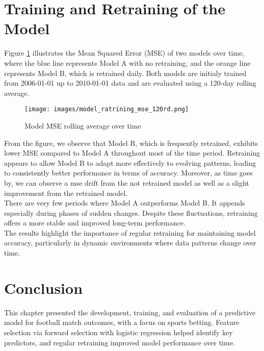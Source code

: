 \section{Training and Retraining of the Model}
\label{sec:training_retraining}

Figure \ref{fig:mse_retraining} illustrates the Mean Squared Error (MSE) of two models over time, where the blue line represents Model A with no retraining, and the orange line represents Model B, which is retrained daily. Both models are initialy trained from 2006-01-01 up to 2010-01-01 data and are evaluated using a 120-day rolling average.

\begin{figure}[H]
    \centering
    \texttt{[image: images/model\_ratrining\_mse\_120rd.png]}
    \caption{Model MSE rolling average over time}
    \label{fig:mse_retraining}
\end{figure}


From the figure, we observe that Model B, which is frequently retrained, exhibits lower MSE compared to Model A throughout most of the time period. Retraining appears to allow Model B to adapt more effectively to evolving patterns, leading to consistently better performance in terms of accuracy. Moreover, as time goes by, we can observe a mse drift from the not retrained model as well as a slight improvement from the retrained model. \\

There are very few periods where Model A outperforms Model B. It appends especially during phases of sudden changes. Despite these fluctuations, retraining offers a more stable and improved long-term performance. \\

The results highlight the importance of regular retraining for maintaining model accuracy, particularly in dynamic environments where data patterns change over time.

\section{Conclusion}

This chapter presented the development, training, and evaluation of a predictive model for football match outcomes, with a focus on sports betting. Feature selection via forward selection with logistic regression helped identify key predictors, and regular retraining improved model performance over time.\\

